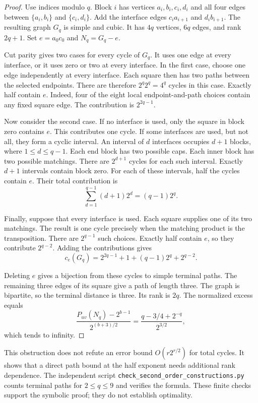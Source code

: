 \begin{proof}
Use indices modulo $q$.
Block $i$ has vertices $a_i,b_i,c_i,d_i$ and all four edges between
$\{a_i,b_i\}$ and $\{c_i,d_i\}$.
Add the interface edges $c_i a_{i+1}$ and $d_i b_{i+1}$.
The resulting graph $G_q$ is simple and cubic.
It has $4q$ vertices, $6q$ edges, and rank $2q+1$.
Set $e=a_0c_0$ and $N_q=G_q-e$.

Cut parity gives two cases for every cycle of $G_q$.
It uses one edge at every interface, or it uses zero or two at every interface.
In the first case, choose one edge independently at every interface.
Each square then has two paths between the selected endpoints.
There are therefore $2^q2^q=4^q$ cycles in this case.
Exactly half contain $e$.
Indeed, four of the eight local endpoint-and-path choices contain any fixed square edge.
The contribution is $2^{2q-1}$.

Now consider the second case.
If no interface is used, only the square in block zero contains $e$.
This contributes one cycle.
If some interfaces are used, but not all, they form a cyclic interval.
An interval of $d$ interfaces occupies $d+1$ blocks, where $1\le d\le q-1$.
Each end block has two possible caps.
Each inner block has two possible matchings.
There are $2^{d+1}$ cycles for each such interval.
Exactly $d+1$ intervals contain block zero.
For each of these intervals, half the cycles contain $e$.
Their total contribution is
\[
 \sum_{d=1}^{q-1}(d+1)2^d=(q-1)2^q.
\]

Finally, suppose that every interface is used.
Each square supplies one of its two matchings.
The result is one cycle precisely when the matching product is the transposition.
There are $2^{q-1}$ such choices.
Exactly half contain $e$, so they contribute $2^{q-2}$.
Adding the contributions gives
\[
 c_e(G_q)=2^{2q-1}+1+(q-1)2^q+2^{q-2}.
\]

Deleting $e$ gives a bijection from these cycles to simple terminal paths.
The remaining three edges of its square give a path of length three.
The graph is bipartite, so the terminal distance is three.
Its rank is $2q$.
The normalized excess equals
\[
 \frac{P_{uv}(N_q)-2^{b-1}}{2^{(b+3)/2}}
 =\frac{q-3/4+2^{-q}}{2^{3/2}},
\]
which tends to infinity.
\end{proof}

This obstruction does not refute an error bound $O(r2^{r/2})$ for total cycles.
It shows that a direct path bound at the half exponent needs additional rank dependence.
The independent script \texttt{check\_second\_order\_constructions.py}
counts terminal paths for $2\le q\le9$ and verifies the formula.
These finite checks support the symbolic proof; they do not establish optimality.
